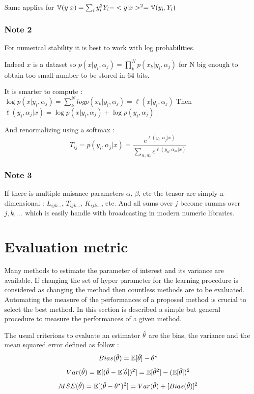 Same applies for $\mathbb{V}(y|x) = \sum_i y_i^2 Y_i - <y|x>^2 = \mathbb{V}(y_i, Y_i)$


\subsubsection{Note 2}

For numerical stability it is best to work with log probabilities.

Indeed $x$ is a dataset so $p(x | y_i, \alpha_j) = \prod_k^N p(x_k | y_i, \alpha_j)$ for N big enough to obtain too small number to be stored in 64 bits.

It is smarter to compute : $\log p(x | y_i, \alpha_j) = \sum_k^N log p(x_k | y_i, \alpha_j) = \ell(x | y_i, \alpha_j)$
Then $\ell(y_i, \alpha_j| x) = \log p(x|y_i, \alpha_j) + \log p(y_i, \alpha_j)$

And renormalizing using a softmax :
$$ 
    T_{ij} = p(y_i, \alpha_j | x) = \frac{e^{\ell(y_i, \alpha_j| x)} }{\sum_{n,m} e^{\ell(y_n, \alpha_m| x)} }
$$


\subsubsection{Note 3}

If there is multiple nuisance parameters $\alpha$, $\beta$, etc the tensor are simply n-dimensional : $L_{ijk...}$, $T_{ijk...}$, $K_{ijk...}$, etc.
And all sums over $j$ become summs over $j,k, ...$ which is easily handle with broadcasting in modern numeric libraries.



\section{Evaluation metric} %
\label{sec:evaluation_metric}


Many methods to estimate the parameter of interest and its variance are available.
If changing the set of hyper parameter for the learning procedure is considered as changing the method then countless methods are to be evaluated.
Automating the measure of the performances of a proposed method is crucial to select the best method.
In this section is described a simple but general procedure to measure the performances of a given method.

The usual criterions to evaluate an estimator $\hat\theta$ are the bias, the variance and the mean squared error defined as follow :
\begin{equation}
  Bias(\hat\theta) = \mathbb{E}[\hat\theta] - \theta^\star
\end{equation}
\begin{equation}
  Var(\hat\theta) = \mathbb{E}[ (\hat\theta - \mathbb{E}[\hat\theta])^2 ] = \mathbb{E}[\hat\theta^2] - (\mathbb{E}[\hat\theta])^2
\end{equation}
\begin{equation}
  MSE(\hat\theta) = \mathbb{E}[(\hat\theta - \theta^\star)^2] = Var(\hat\theta) + [Bias(\hat\theta)]^2
\end{equation}

